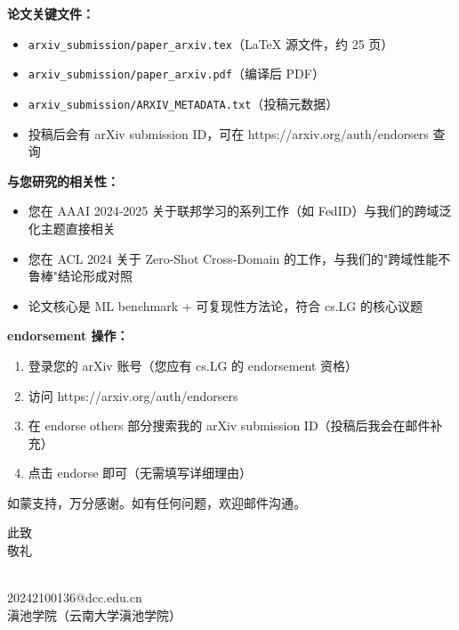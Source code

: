 \documentclass[11pt]{article}
\begin{document}
\vspace{0.2cm}

\noindent\textbf{论文关键文件：}
\begin{itemize}
\item \texttt{arxiv\_submission/paper\_arxiv.tex}（LaTeX 源文件，约 25 页）
\item \texttt{arxiv\_submission/paper\_arxiv.pdf}（编译后 PDF）
\item \texttt{arxiv\_submission/ARXIV\_METADATA.txt}（投稿元数据）
\item 投稿后会有 arXiv submission ID，可在 https://arxiv.org/auth/endorsers 查询
\end{itemize}

\vspace{0.2cm}

\noindent\textbf{与您研究的相关性：}
\begin{itemize}
\item 您在 AAAI 2024-2025 关于联邦学习的系列工作（如 FedID）与我们的跨域泛化主题直接相关
\item 您在 ACL 2024 关于 Zero-Shot Cross-Domain 的工作，与我们的"跨域性能不鲁棒"结论形成对照
\item 论文核心是 ML benchmark + 可复现性方法论，符合 cs.LG 的核心议题
\end{itemize}

\vspace{0.2cm}

\noindent\textbf{endorsement 操作：}
\begin{enumerate}
\item 登录您的 arXiv 账号（您应有 cs.LG 的 endorsement 资格）
\item 访问 https://arxiv.org/auth/endorsers
\item 在 endorse others 部分搜索我的 arXiv submission ID（投稿后我会在邮件补充）
\item 点击 endorse 即可（无需填写详细理由）
\end{enumerate}

\vspace{0.2cm}

\noindent 如蒙支持，万分感谢。如有任何问题，欢迎邮件沟通。

\vspace{0.3cm}

\noindent 此致 \\
敬礼

\vspace{0.3cm}

\noindent [你的名字] \\
20242100136@dcc.edu.cn \\
滇池学院（云南大学滇池学院）
\end{document}
